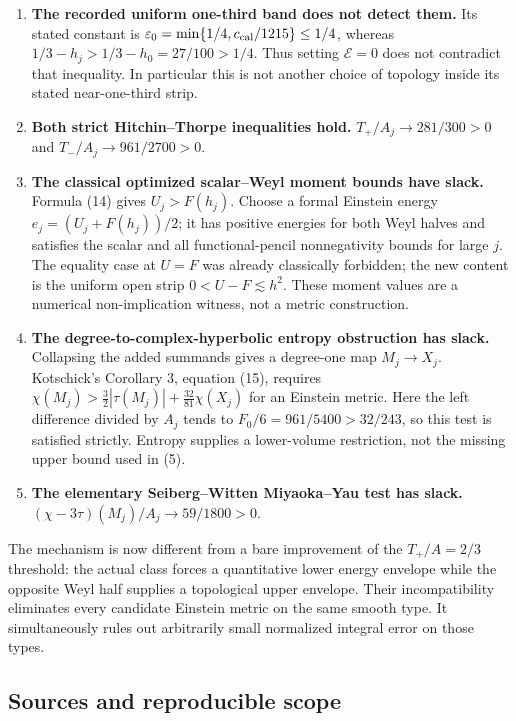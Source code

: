 \documentclass[
  10pt,
]{article}
\providecommand{\tightlist}{%
  \setlength{\itemsep}{0pt}\setlength{\parskip}{0pt}}
\begin{document}
\begin{enumerate}
\def\labelenumi{\arabic{enumi}.}
\tightlist
\item
  \textbf{The recorded uniform one-third band does not detect them.} Its
  stated constant is
  \(\varepsilon_0=\min\{1/4,c_{\rm cal}/1215\}\le1/4\), whereas
  \(1/3-h_j>1/3-h_0=27/100>1/4\). Thus setting \(\mathcal E=0\) does not
  contradict that inequality. In particular this is not another choice
  of topology inside its stated near-one-third strip.
\item
  \textbf{Both strict Hitchin--Thorpe inequalities hold.}
  \(T_+/A_j\to281/300>0\) and \(T_-/A_j\to961/2700>0\).
\item
  \textbf{The classical optimized scalar--Weyl moment bounds have
  slack.} Formula (14) gives \(U_j>F(h_j)\). Choose a formal Einstein
  energy \(e_j=(U_j+F(h_j))/2\); it has positive energies for both Weyl
  halves and satisfies the scalar and all functional-pencil
  nonnegativity bounds for large \(j\). The equality case at \(U=F\) was
  already classically forbidden; the new content is the uniform open
  strip \(0<U-F\lesssim h^2\). These moment values are a numerical
  non-implication witness, not a metric construction.
\item
  \textbf{The degree-to-complex-hyperbolic entropy obstruction has
  slack.} Collapsing the added summands gives a degree-one map
  \(M_j\to X_j\). Kotschick's Corollary 3, equation (15), requires
  \(\chi(M_j)>\frac32|\tau(M_j)|+\frac{32}{81}\chi(X_j)\) for an
  Einstein metric. Here the left difference divided by \(A_j\) tends to
  \(F_0/6=961/5400>32/243\), so this test is satisfied strictly. Entropy
  supplies a lower-volume restriction, not the missing upper bound used
  in (5).
\item
  \textbf{The elementary Seiberg--Witten Miyaoka--Yau test has slack.}
  \((\chi-3\tau)(M_j)/A_j\to59/1800>0\).
\end{enumerate}

The mechanism is now different from a bare improvement of the
\(T_+/A=2/3\) threshold: the actual class forces a quantitative lower
energy envelope while the opposite Weyl half supplies a topological
upper envelope. Their incompatibility eliminates every candidate
Einstein metric on the same smooth type. It simultaneously rules out
arbitrarily small normalized integral error on those types.

\hypertarget{sources-and-reproducible-scope}{%
\subsection{Sources and reproducible
scope}\label{sources-and-reproducible-scope}}
\end{document}
